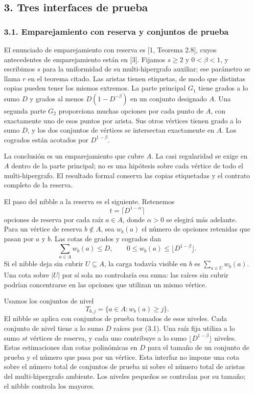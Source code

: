 \documentclass[spanish,11pt,a4paper]{article}
\begin{document}
\subsection{3. Tres interfaces de prueba}\label{tres-interfaces-de-prueba}


\subsubsection{3.1. Emparejamiento con reserva y conjuntos de prueba}\label{emparejamiento-con-reserva-y-conjuntos-de-prueba}

El enunciado de emparejamiento con reserva es {[}1, Teorema 2.8{]}, cuyos antecedentes de emparejamiento están en {[}3{]}. Fijamos \(s\ge2\) y \(0<\beta<1\), y escribimos \(s\) para la uniformidad de su multi-hipergrafo auxiliar; ese parámetro se llama \(r\) en el teorema citado. Las aristas tienen etiquetas, de modo que distintas copias pueden tener los mismos extremos. La parte principal \(G_1\) tiene grados a lo sumo \(D\) y grados al menos \(D(1-D^{-\beta})\) en un conjunto designado \(A\). Una segunda parte \(G_2\) proporciona muchas opciones por cada punto de \(A\), con exactamente uno de esos puntos por arista. Sus otros vértices tienen grado a lo sumo \(D\), y los dos conjuntos de vértices se intersectan exactamente en \(A\). Los cogrados están acotados por \(D^{1-\beta}\).

La conclusión es un emparejamiento que cubre \(A\). La casi regularidad se exige en \(A\) dentro de la parte principal; no es una hipótesis sobre cada vértice de todo el multi-hipergrafo. El resultado formal conserva las copias etiquetadas y el contrato completo de la reserva.

El paso del nibble a la reserva es el siguiente. Retenemos \[t=\lceil D^{1-\alpha}\rceil\] opciones de reserva por cada raíz \(a\in A\), donde \(\alpha>0\) se elegirá más adelante. Para un vértice de reserva \(b\notin A\), sea \(w_b(a)\) el número de opciones retenidas que pasan por \(a\) y \(b\). Las cotas de grados y cogrados dan \[\sum_{a\in A}w_b(a)\le D,
\qquad
0\le w_b(a)\le\lfloor D^{1-\beta}\rfloor.
\tag{3.1}\] Si el nibble deja sin cubrir \(U\subseteq A\), la carga todavía visible en \(b\) es \(\sum_{a\in U}w_b(a)\). Una cota sobre \(|U|\) por sí sola no controlaría esa suma: las raíces sin cubrir podrían concentrarse en las opciones que utilizan un mismo vértice.

Usamos los conjuntos de nivel \[T_{b,j}=\{a\in A:w_b(a)\ge j\}.\] El nibble se aplica con conjuntos de prueba tomados de esos niveles. Cada conjunto de nivel tiene a lo sumo \(D\) raíces por (3.1). Una raíz fija utiliza a lo sumo \(s t\) vértices de reserva, y cada uno contribuye a lo sumo \(\lfloor D^{1-\beta}\rfloor\) niveles. Estas estimaciones dan cotas polinómicas en \(D\) para el tamaño de un conjunto de prueba y el número que pasa por un vértice. Esta interfaz no impone una cota sobre el número total de conjuntos de prueba ni sobre el número total de aristas del multi-hipergrafo ambiente. Los niveles pequeños se controlan por su tamaño; el nibble controla los mayores.
\end{document}
